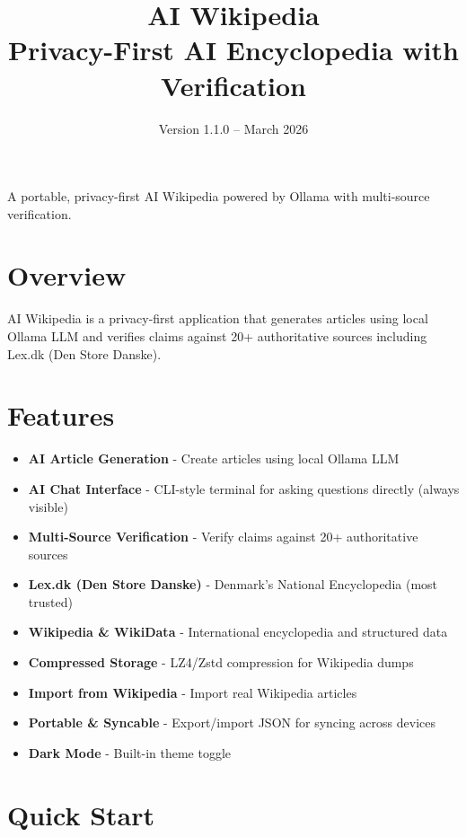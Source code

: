 \documentclass[11pt,a4paper]{article}
\title{\textbf{AI Wikipedia}\\\large Privacy-First AI Encyclopedia with Verification}
\author{}
\date{Version 1.1.0 -- March 2026}
\begin{document}
\maketitle
\thispagestyle{empty}

\vspace{2in}
\begin{center}
\Large A portable, privacy-first AI Wikipedia powered by Ollama with multi-source verification.
\end{center}

\newpage

\tableofcontents
\newpage

\section{Overview}

AI Wikipedia is a privacy-first application that generates articles using local Ollama LLM and verifies claims against 20+ authoritative sources including Lex.dk (Den Store Danske).

\section{Features}

\begin{itemize}
    \item \textbf{AI Article Generation} - Create articles using local Ollama LLM
    \item \textbf{AI Chat Interface} - CLI-style terminal for asking questions directly (always visible)
    \item \textbf{Multi-Source Verification} - Verify claims against 20+ authoritative sources
    \item \textbf{Lex.dk (Den Store Danske)} - Denmark's National Encyclopedia (most trusted)
    \item \textbf{Wikipedia \& WikiData} - International encyclopedia and structured data
    \item \textbf{Compressed Storage} - LZ4/Zstd compression for Wikipedia dumps
    \item \textbf{Import from Wikipedia} - Import real Wikipedia articles
    \item \textbf{Portable \& Syncable} - Export/import JSON for syncing across devices
    \item \textbf{Dark Mode} - Built-in theme toggle
\end{itemize}

\section{Quick Start}
\end{document}
